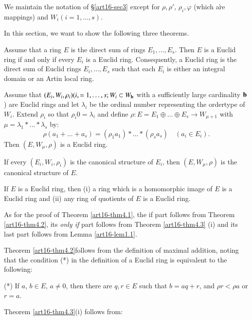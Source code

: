 We maintain the notation of \S \ref{art16-sec3} except for $\rho, \rho'$, $\rho_i, \varphi$ (which a\`re mappings) and $W_i (i = 1, \ldots, s)$.

In this section, we want to show the following three theorems.

\begin{thm}\label{art16-thm4.1}
Assume that a ring $E$ is the direct sum of rings $E_1, \ldots, E_s$. Then $E$ is a Euclid ring if and only if every $E_i$ is a Euclid ring. Consequently, a Euclid ring is the direct sum of Euclid rings $E_i, \ldots, E_s$ such that each $E_i$ is either an integral domain or an Artin local ring.
\end{thm}

\begin{thm}\label{art16-thm4.2}
Assume that $(E_i, W_i, \rho_i) (i, = 1, \ldots, s; W_i \subset W_{\mathbf{b}}$  with  a sufficiently large cardinality $\mathbf{b}$) are Euclid rings and let $\lambda_i$ be the ordinal number representing the ordertype of $W_i$. Extend $\rho_i$ so that $\rho_i 0 = \lambda_i$ and define $\rho: E = E_1 \oplus \ldots \oplus E_s \to W_{\mu +1}$ with $\mu =\lambda_1 * \ldots * \lambda_s$ by:
$$
\rho (a_1 + \ldots + a_s) = (\rho_1 a_1) * \ldots * (\rho_s a_s) \quad (a_i \in E_i).
$$
Then $(E, W_{\mu}, \rho)$ is a Euclid ring. 

If every $(E_i, W_i, \rho_i)$ is the canonical structure of $E_i$, then $(E, W_{\mu}, \rho)$ is the canonical structure of $E$.
\end{thm}

\begin{thm}\label{art16-thm4.3}
If $E$ is a Euclid ring, then (i) a ring which is a homomorphic image of $E$ is a Euclid ring and (ii) any ring of quotients of $E$ is a Euclid ring.
\end{thm}

As for the proof of Theorem \ref{art16-thm4.1}, the if part follows from Theorem \ref{art16-thm4.2}, its {\em only if } part follows from Theorem \ref{art16-thm4.3} (i) and its last part follows from Lemma \ref{art16-lem1.1}.

Theorem \ref{art16-thm4.2}\pageoriginale    follows from the definition of maximal addition, noting that the condition (*) in the definition of a Euclid ring is equivalent to the following:

(*) If $a$, $b\in E$, $a \neq 0$, then there are $q,r \in E$ such that $b = aq +r$, and $\rho r< \rho a $ or $r =a$.


Theorem \ref{art16-thm4.3}(i) follows from:

